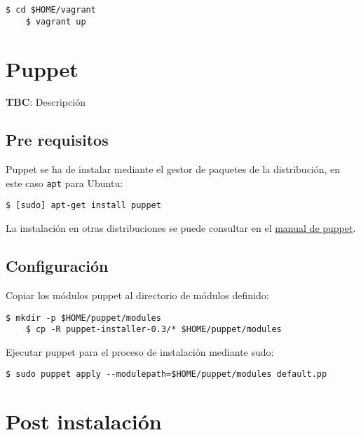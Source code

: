 \lstset{style=bashbasico}
\begin{lstlisting}[frame=trbl]
    $ cd $HOME/vagrant
    $ vagrant up
\end{lstlisting}

\section{Puppet}
\label{puppet}

\textbf{TBC}: Descripción

\subsection{Pre requisitos}
\label{sub:puppet-pre-requisitos}

\par Puppet se ha de instalar mediante el gestor de paquetes de la distribución, en este caso \texttt{apt} para Ubuntu:

\lstset{style=bashbasico}
\begin{lstlisting}[frame=trbl]
    $ [sudo] apt-get install puppet
\end{lstlisting}

\par La instalación en otras distribuciones se puede consultar en el \href{http://docs.puppetlabs.com/guides/installation.html}{manual de puppet}.

\subsection{Configuración}
\label{sub:configuracion-puppet}

\par Copiar los módulos puppet al directorio de módulos definido:

\lstset{style=bashbasico}
\begin{lstlisting}[frame=trbl]
    $ mkdir -p $HOME/puppet/modules
    $ cp -R puppet-installer-0.3/* $HOME/puppet/modules
\end{lstlisting}

\par Ejecutar puppet para el proceso de instalación mediante sudo:

\lstset{style=bashbasico}
\begin{lstlisting}[frame=trbl]
    $ sudo puppet apply --modulepath=$HOME/puppet/modules default.pp
\end{lstlisting}

\section{Post instalación}
\label{sec:post-instalacion}

